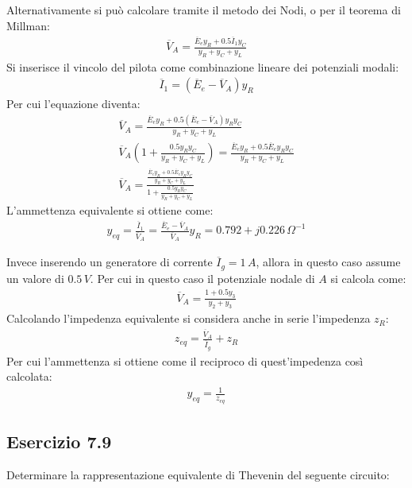 \documentclass{article}
\begin{document}
Alternativamente si può calcolare tramite il metodo dei Nodi, o per il teorema di Millman:
\begin{gather*}
    \overline{V}_A=\displaystyle\frac{\overline{E}_ey_R+0.5\overline{I}_1y_C}{y_R+y_C+y_L}
\end{gather*}
Si inserisce il vincolo del pilota come combinazione lineare dei potenziali modali:
\begin{gather*}
    \overline{I}_1=(\overline{E}_e-\overline{V}_A)y_R
\end{gather*}
Per cui l'equazione diventa:
\begin{gather*}
    \overline{V}_A=\displaystyle\frac{\overline{E}_ey_R+0.5(\overline{E}_e-\overline{V}_A)y_Ry_C}{y_R+y_C+y_L}\\
    \overline{V}_A\left(1+\displaystyle\frac{0.5y_Ry_C}{y_R+y_C+y_L}\right)=\frac{\overline{E}_ey_R+0.5\overline{E}_ey_Ry_C}{y_R+y_C+y_L}\\
    \overline{V}_A=\displaystyle\frac{\frac{\overline{E}_ey_R+0.5\overline{E}_ey_Ry_C}{y_R+y_C+y_L}}{1+\frac{0.5y_Ry_C}{y_R+y_C+y_L}}
\end{gather*}
L'ammettenza equivalente si ottiene come:
\begin{gather}
    y_{eq}=\displaystyle\frac{\overline{I}_1}{\overline{V}_A}=\frac{\overline{E}_e-\overline{V}_A}{\overline{V}_A}y_R=0.792+j0.226\,\Omega^{-1}
\end{gather}


Invece inserendo un generatore di corrente $\overline{I}_g=1\,A$, allora in questo caso assume un valore di $0.5\,V$. Per cui in questo caso il potenziale nodale di $A$ si 
calcola come:
\begin{gather*}
    \overline{V}_A=\displaystyle\frac{1+0.5y_3}{y_2+y_3}
\end{gather*}
Calcolando l'impedenza equivalente si considera anche in serie l'impedenza $z_R$:
\begin{gather*}
    z_{eq}=\displaystyle\frac{\overline{V}_A}{\overline{I}_g}+z_R
\end{gather*}
Per cui l'ammettenza si ottiene come il reciproco di quest'impedenza così calcolata:
\begin{gather*}
    y_{eq}=\displaystyle\frac{1}{z_{eq}}
\end{gather*}

\subsection{Esercizio 7.9}

Determinare la rappresentazione equivalente di Thevenin del seguente circuito:
\end{document}
